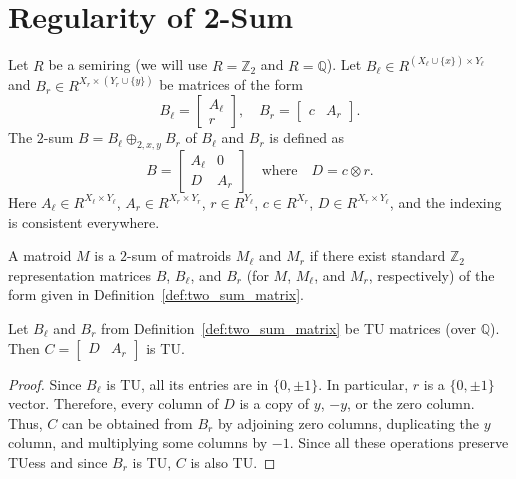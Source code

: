 \chapter{Regularity of 2-Sum}

\begin{definition}\label{def:two_sum_matrix}
    Let $R$ be a semiring (we will use $R = \mathbb{Z}_{2}$ and $R = \mathbb{Q}$). Let $B_{\ell} \in R^{(X_{\ell} \cup \{x\}) \times Y_{\ell}}$ and $B_{r} \in R^{X_{r} \times (Y_{r} \cup \{y\})}$ be matrices of the form
    \[
        B_{\ell} = \begin{bmatrix} A_{\ell} \\ r \end{bmatrix}, \quad
        B_{r} = \begin{bmatrix} c & A_{r} \end{bmatrix}.
    \]
    The $2$-sum $B = B_{\ell} \oplus_{2, x, y} B_{r}$ of $B_{\ell}$ and $B_{r}$ is defined as
    \[
        B = \begin{bmatrix} A_{\ell} & 0 \\ D & A_{r} \end{bmatrix}
        \quad \text{where} \quad
        D = c \otimes r.
    \]
    Here $A_{\ell} \in R^{X_{\ell} \times Y_{\ell}}$, $A_{r} \in R^{X_{r} \times Y_{r}}$, $r \in R^{Y_{\ell}}$, $c \in R^{X_{r}}$, $D \in R^{X_{r} \times Y_{\ell}}$, and the indexing is consistent everywhere.
\end{definition}

\begin{definition}\label{def:two_sum_matroid}
    A matroid $M$ is a $2$-sum of matroids $M_{\ell}$ and $M_{r}$ if there exist standard $\mathbb{Z}_{2}$ representation matrices $B$, $B_{\ell}$, and $B_{r}$ (for $M$, $M_{\ell}$, and $M_{r}$, respectively) of the form given in Definition~\ref{def:two_sum_matrix}.
\end{definition}

\begin{lemma}\label{lem:two_sum_bottom_tu}
    Let $B_{\ell}$ and $B_{r}$ from Definition~\ref{def:two_sum_matrix} be TU matrices (over $\mathbb{Q}$). Then $C = \begin{bmatrix} D & A_{r} \end{bmatrix}$ is TU.
\end{lemma}

\begin{proof}
    Since $B_{\ell}$ is TU, all its entries are in $\{0, \pm 1\}$. In particular, $r$ is a $\{0, \pm 1\}$ vector. Therefore, every column of $D$ is a copy of $y$, $-y$, or the zero column. Thus, $C$ can be obtained from $B_{r}$ by adjoining zero columns, duplicating the $y$ column, and multiplying some columns by $-1$. Since all these operations preserve TUess and since $B_{r}$ is TU, $C$ is also TU.
\end{proof}

